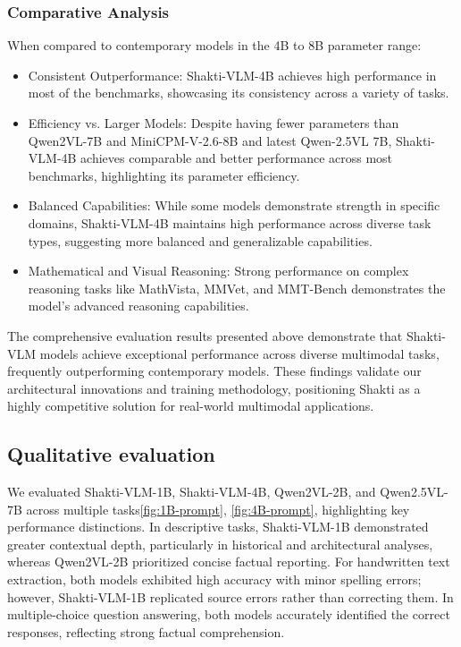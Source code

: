 \documentclass{article}
\begin{document}
\subsubsection{Comparative Analysis}
When compared to contemporary models in the 4B to 8B parameter range: 

\begin{itemize}
    \item Consistent Outperformance: Shakti-VLM-4B achieves high performance in most of the benchmarks, showcasing its consistency across a variety of tasks. 

    \item Efficiency vs. Larger Models: Despite having fewer parameters than Qwen2VL-7B\cite{wang2024qwen2vlenhancingvisionlanguagemodels} and MiniCPM-V-2.6-8B\cite{yao2024minicpm26} and latest Qwen-2.5VL 7B\cite{bai2025qwen25vltechnicalreport}, Shakti-VLM-4B achieves comparable and better performance across most benchmarks, highlighting its parameter efficiency. 

    \item Balanced Capabilities: While some models demonstrate strength in specific domains, Shakti-VLM-4B maintains high performance across diverse task types, suggesting more balanced and generalizable capabilities. 

    \item Mathematical and Visual Reasoning: Strong performance on complex reasoning tasks like MathVista, MMVet, and MMT-Bench demonstrates the model's advanced reasoning capabilities. 
\end{itemize}

The comprehensive evaluation results presented above demonstrate that Shakti-VLM models achieve exceptional performance across diverse multimodal tasks, frequently outperforming contemporary models. These findings validate our architectural innovations and training methodology, positioning Shakti as a highly competitive solution for real-world multimodal applications. 


\subsection{Qualitative evaluation}

We evaluated Shakti-VLM-1B, Shakti-VLM-4B, Qwen2VL-2B, and Qwen2.5VL-7B across multiple tasks\ref{fig:1B-prompt}, \ref{fig:4B-prompt}, highlighting key performance distinctions. In descriptive tasks, Shakti-VLM-1B demonstrated greater contextual depth, particularly in historical and architectural analyses, whereas Qwen2VL-2B\cite{wang2024qwen2vlenhancingvisionlanguagemodels} prioritized concise factual reporting. For handwritten text extraction, both models exhibited high accuracy with minor spelling errors; however, Shakti-VLM-1B replicated source errors rather than correcting them. In multiple-choice question answering, both models accurately identified the correct responses, reflecting strong factual comprehension.
\end{document}
